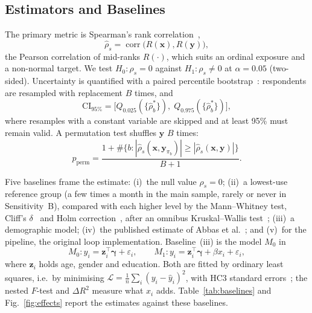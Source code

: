 \subsection{Estimators and Baselines}\label{sec:estimators}
The primary metric is Spearman's rank correlation~\cite{spearman1904proof},
\begin{equation}
\hat\rho_s=\operatorname{corr}\bigl(R(\mathbf{x}),R(\mathbf{y})\bigr), \label{eq:rho}
\end{equation}
the Pearson correlation of mid-ranks $R(\cdot)$, which suits an ordinal exposure and a non-normal target. We test $H_0\colon\rho_s=0$ against $H_1\colon\rho_s\neq0$ at $\alpha=0.05$ (two-sided). Uncertainty is quantified with a paired percentile bootstrap~\cite{efron1979bootstrap}: respondents are resampled with replacement $B$ times, and
\begin{equation}
\mathrm{CI}_{95\%}=\bigl[Q_{0.025}(\{\hat\rho^{*}_{b}\}),\;Q_{0.975}(\{\hat\rho^{*}_{b}\})\bigr], \label{eq:ci}
\end{equation}
where resamples with a constant variable are skipped and at least 95\% must remain valid. A permutation test shuffles $\mathbf{y}$ $B$ times:
\begin{equation}
p_{\text{perm}}=\frac{1+\#\bigl\{b\colon|\hat\rho_s(\mathbf{x},\mathbf{y}_{\pi_b})|\ge|\hat\rho_s(\mathbf{x},\mathbf{y})|\bigr\}}{B+1}. \label{eq:perm}
\end{equation}

Five baselines frame the estimate: (i)~the null value $\rho_s=0$; (ii)~a lowest-use reference group (a few times a month in the main sample, rarely or never in Sensitivity~B), compared with each higher level by the Mann--Whitney test, Cliff's $\delta$~\cite{cliff1993dominance} and Holm correction~\cite{holm1979simple}, after an omnibus Kruskal--Wallis test~\cite{kruskal1952ranks}; (iii)~a demographic model; (iv)~the published estimate of Abbas et al.~\cite{abbas2024harmful}; and (v)~for the pipeline, the original loop implementation. Baseline~(iii) is the model $M_0$ in
\begin{equation}
M_0\colon y_i=\mathbf{z}_i^{\top}\boldsymbol\gamma+\varepsilon_i,\qquad M_1\colon y_i=\mathbf{z}_i^{\top}\boldsymbol\gamma+\beta x_i+\varepsilon_i, \label{eq:models}
\end{equation}
where $\mathbf{z}_i$ holds age, gender and education. Both are fitted by ordinary least squares, i.e.\ by minimising $\mathcal{L}=\frac{1}{n}\sum_i(y_i-\hat y_i)^2$, with HC3 standard errors~\cite{long2000hc}; the nested $F$-test and $\Delta R^2$ measure what $x_i$ adds. Table~\ref{tab:baselines} and Fig.~\ref{fig:effects} report the estimates against these baselines.

